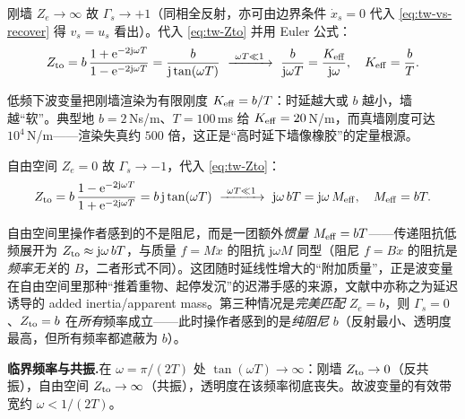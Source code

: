 \begin{derivation}[刚墙：渲染刚度 $K_{\rm eff}=b/T$]
刚墙 $Z_e\to\infty$ 故 $\Gamma_s\to+1$（同相全反射，亦可由边界条件 $\dot x_s=0$ 代入 \cref{eq:tw-vs-recover} 得 $v_s=u_s$ 看出）。代入 \cref{eq:tw-Zto} 并用 Euler 公式：
\begin{equation}
  Z_{\rm to}=b\,\frac{1+\mathrm e^{-2\mathrm j\omega T}}{1-\mathrm e^{-2\mathrm j\omega T}}
          =\frac{b}{\mathrm j\tan(\omega T)}\ \xrightarrow{\ \omega T\ll1\ }\ \frac{b}{\mathrm j\omega T}=\frac{K_{\rm eff}}{\mathrm j\omega},\quad K_{\rm eff}=\frac{b}{T}.
  \label{eq:tw-Keff}
\end{equation}
\end{derivation}

低频下波变量把刚墙渲染为有限刚度 $K_{\rm eff}=b/T$：时延越大或 $b$ 越小，墙越“软”。典型地 $b=2\,$Ns/m、$T=100\,$ms 给 $K_{\rm eff}=20\,$N/m，而真墙刚度可达 $10^4\,$N/m——渲染失真约 $500$ 倍，这正是“高时延下墙像橡胶”的定量根源。

\begin{derivation}[自由空间：残余惯量 $M_{\rm eff}=bT$]
自由空间 $Z_e=0$ 故 $\Gamma_s\to-1$，代入 \cref{eq:tw-Zto}：
\begin{equation}
  Z_{\rm to}=b\,\frac{1-\mathrm e^{-2\mathrm j\omega T}}{1+\mathrm e^{-2\mathrm j\omega T}}=b\,\mathrm j\tan(\omega T)\ \xrightarrow{\ \omega T\ll1\ }\ \mathrm j\omega\,bT=\mathrm j\omega\,M_{\rm eff},\quad M_{\rm eff}=bT.
  \label{eq:tw-Beff}
\end{equation}
\end{derivation}

自由空间里操作者感到的不是阻尼，而是一团额外\emph{惯量} $M_{\rm eff}=bT$——传递阻抗低频展开为 $Z_{\rm to}\approx\mathrm j\omega\,bT$，与质量 $f=M\ddot x$ 的阻抗 $\mathrm j\omega M$ 同型（阻尼 $f=B\dot x$ 的阻抗是\emph{频率无关}的 $B$，二者形式不同）。这团随时延线性增大的“附加质量”，正是波变量在自由空间里那种“推着重物、起停发沉”的迟滞手感的来源，文献中亦称之为延迟诱导的 added inertia/apparent mass。第三种情况是\emph{完美匹配} $Z_e=b$，则 $\Gamma_s=0$、$Z_{\rm to}=b$ 在\emph{所有}频率成立——此时操作者感到的是\emph{纯阻尼} $b$（反射最小、透明度最高，但所有频率都遮蔽为 $b$）。

\begin{note}
\textbf{临界频率与共振.}\;在 $\omega=\pi/(2T)$ 处 $\tan(\omega T)\to\infty$：刚墙 $Z_{\rm to}\to0$（反共振），自由空间 $Z_{\rm to}\to\infty$（共振），透明度在该频率彻底丧失。故波变量的有效带宽约 $\omega<1/(2T)$。
\end{note}

